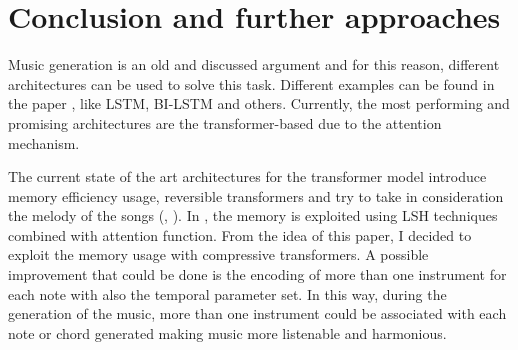 \section{Conclusion and further approaches}
\label{OAFMG}
Music generation is an old and discussed argument and for this reason, different architectures can be used to solve this task.
Different examples can be found in the paper \cite{music_survey}, like LSTM, BI-LSTM and others. Currently, the most performing and promising architectures are the transformer-based due to the attention mechanism.

The current state of the art architectures for the transformer model introduce memory efficiency usage, reversible transformers and try to take in consideration the melody of the songs (\cite{eff_transf}, \cite{transformer_autoencoders}).
In \cite{eff_transf}, the memory is exploited using LSH techniques combined with attention function. From the idea of this paper, I decided to exploit the memory usage with compressive transformers. A possible improvement that could be done is the encoding of more than one instrument for each note with also the temporal parameter set. In this way, during the generation of the music, more than one instrument could be associated with each note or chord generated making music more listenable and harmonious. 

\begin{comment}
\textbf{Possibile citazione ad altri paper} \textbf{Parlare della possibilità di fare encoding di più strumenti} \textbf{Come si può migliorare il mio modello?}
\end{comment}
